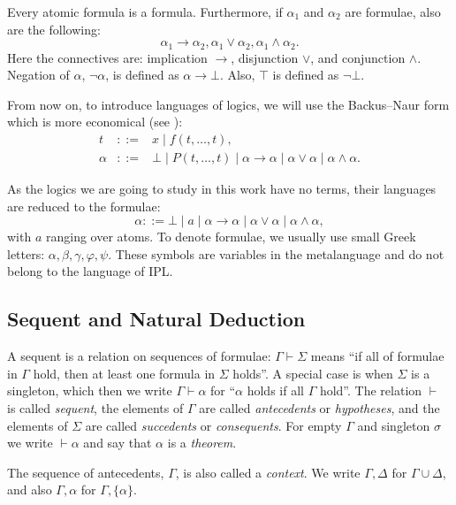 \begin{definition}[Formula]
Every atomic formula is a formula. Furthermore, if $\alpha_1$ and $\alpha_2$ are formulae, also are the following:
\[
\alpha_1 \rightarrow \alpha_2, \alpha_1 \vee \alpha_2, \alpha_1 \wedge \alpha_2.
\]
Here the connectives are: implication $\rightarrow$, disjunction $\vee$, and conjunction $\wedge$.
Negation of $\alpha$, $\neg\alpha$, is defined as $\alpha \rightarrow \bot$. Also, $\top$ is defined as $\neg\bot$.
\end{definition}

From now on, to introduce languages of logics, we will use the Backus--Naur form which is more economical (see \cite{DBLP:conf/ifip/Backus59}):
\begin{eqnarray*}
t &::=& x \mid f(t, \dots, t), \\
\alpha &::=& \bot \mid P(t, \dots, t) \mid \alpha \rightarrow \alpha \mid \alpha \vee \alpha \mid \alpha \wedge \alpha.
\end{eqnarray*}

As the logics we are going to study in this work have no terms, their languages are reduced to the formulae:
\[
\alpha ::= \bot \mid a \mid \alpha \rightarrow \alpha \mid \alpha \vee \alpha \mid \alpha \wedge \alpha,
\]
with $a$ ranging over atoms. To denote formulae, we usually use small Greek letters: $\alpha, \beta, \gamma, \varphi, \psi$. These symbols are variables in the metalanguage and do not belong to the language of IPL.

\subsection{Sequent and Natural Deduction}

\begin{definition}[Sequent]
A sequent is a relation on sequences of formulae: $\Gamma \vdash \Sigma$ means ``if all of formulae in $\Gamma$ hold, then at least one formula in $\Sigma$ holds''. A special case is when $\Sigma$ is a singleton, which then we write $\Gamma \vdash \alpha$ for ``$\alpha$ holds if all $\Gamma$ hold''.
The relation $\vdash$ is called \textit{sequent}, the elements of $\Gamma$ are called \textit{antecedents} or \textit{hypotheses}, and the elements of $\Sigma$ are called \textit{succedents} or \textit{consequents}. For empty $\Gamma$ and singleton $\sigma$ we write $\vdash \alpha$ and say that $\alpha$ is a \textit{theorem}.
\end{definition}

The sequence of antecedents, $\Gamma$, is also called a \textit{context}. We write $\Gamma, \Delta$ for $\Gamma \cup \Delta$, and also $\Gamma, \alpha$ for $\Gamma, \{\alpha\}$.

